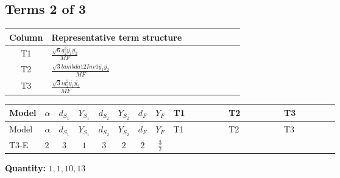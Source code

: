 \documentclass[8pt]{article}
\begin{document}
\begin{landscape}
\subsection*{Terms 2 of 3}
\begin{center}
\begin{tabular}{@{}c >{\raggedright\arraybackslash}p{0.82\linewidth}@{}}
\toprule
Column & Representative term structure \\
\midrule
T1 & \(\displaystyle \frac{\sqrt{6} g_{2}^{2} \overline{y_{1}} \overline{y_{2}}}{MF}\) \\
\midrule
T2 & \(\displaystyle \frac{\sqrt{3} lambda12Inv1 \overline{y_{1}} \overline{y_{2}}}{MF}\) \\
\midrule
T3 & \(\displaystyle \frac{\sqrt{3} i g_{2}^{2} \overline{y_{1}} \overline{y_{2}}}{MF}\) \\
\midrule
\bottomrule
\end{tabular}
\end{center}
\smallskip
\tiny
\begin{longtable}{@{}llcccccc >{\raggedright\arraybackslash}p{0.21\linewidth} >{\raggedright\arraybackslash}p{0.21\linewidth} >{\raggedright\arraybackslash}p{0.21\linewidth}@{}}
\toprule
Model & $\alpha$ & $d_{S_1}$ & $Y_{S_1}$ & $d_{S_2}$ & $Y_{S_2}$ & $d_F$ & $Y_F$ & T1 & T2 & T3 \\
\midrule
\endfirsthead
\toprule
Model & $\alpha$ & $d_{S_1}$ & $Y_{S_1}$ & $d_{S_2}$ & $Y_{S_2}$ & $d_F$ & $Y_F$ & T1 & T2 & T3 \\
\midrule
\endhead
T3-E & $2$ & $3$ & $1$ & $3$ & $2$ & $2$ & $\frac{3}{2}$ & \scriptsize\adjustbox{max width=\linewidth}{$\begin{gathered} - \frac{\sqrt{6} g_{2}^{2} \overline{y_{1}} \overline{y_{2}}}{3 MF}\end{gathered}$} & \scriptsize\adjustbox{max width=\linewidth}{$\begin{gathered} \frac{\sqrt{3} lambda12Inv1 \overline{y_{1}} \overline{y_{2}}}{6 MF}\end{gathered}$} & \scriptsize\adjustbox{max width=\linewidth}{$\begin{gathered} \frac{\sqrt{3} i g_{2}^{2} \overline{y_{1}} \overline{y_{2}}}{6 MF}\end{gathered}$} \\
\midrule
\bottomrule
\end{longtable}
\clearpage
\noindent\textbf{Quantity: }$\mathrm{1,1,10,13}$\par\smallskip

\end{landscape}
\end{document}

